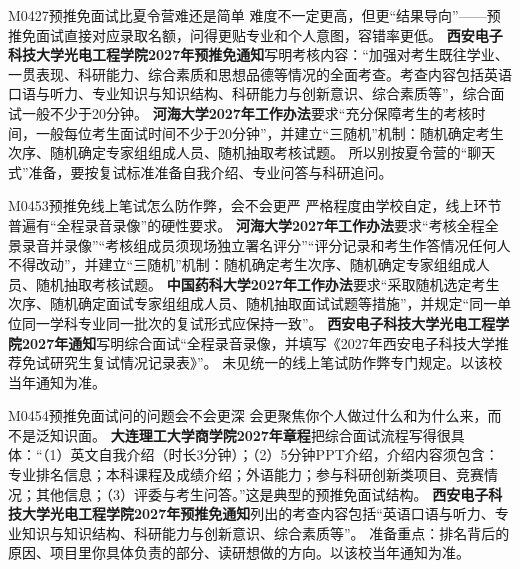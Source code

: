 \begin{qa}{M0427}{预推免面试比夏令营难还是简单}
难度不一定更高，但更“结果导向”——预推免面试直接对应录取名额，问得更贴专业和个人意图，容错率更低。
\textbf{西安电子科技大学光电工程学院2027年预推免通知}写明考核内容：“加强对考生既往学业、一贯表现、科研能力、综合素质和思想品德等情况的全面考查。考查内容包括英语口语与听力、专业知识与知识结构、科研能力与创新意识、综合素质等”，综合面试一般不少于20分钟。
\textbf{河海大学2027年工作办法}要求“充分保障考生的考核时间，一般每位考生面试时间不少于20分钟”，并建立“三随机”机制：随机确定考生次序、随机确定专家组组成人员、随机抽取考核试题。
所以别按夏令营的“聊天式”准备，要按复试标准准备自我介绍、专业问答与科研追问。
\end{qa}

\begin{qa}{M0453}{预推免线上笔试怎么防作弊，会不会更严}
严格程度由学校自定，线上环节普遍有“全程录音录像”的硬性要求。
\textbf{河海大学2027年工作办法}要求“考核全程全景录音并录像”“考核组成员须现场独立署名评分”“评分记录和考生作答情况任何人不得改动”，并建立“三随机”机制：随机确定考生次序、随机确定专家组组成人员、随机抽取考核试题。
\textbf{中国药科大学2027年工作办法}要求“采取随机选定考生次序、随机确定面试专家组组成人员、随机抽取面试试题等措施”，并规定“同一单位同一学科专业同一批次的复试形式应保持一致”。
\textbf{西安电子科技大学光电工程学院2027年通知}写明综合面试“全程录音录像，并填写《2027年西安电子科技大学推荐免试研究生复试情况记录表》”。
未见统一的线上笔试防作弊专门规定。以该校当年通知为准。
\end{qa}

\begin{qa}{M0454}{预推免面试问的问题会不会更深}
会更聚焦你个人做过什么和为什么来，而不是泛知识面。
\textbf{大连理工大学商学院2027年章程}把综合面试流程写得很具体：“（1）英文自我介绍（时长3分钟）；（2）5分钟PPT介绍，介绍内容须包含：专业排名信息；本科课程及成绩介绍；外语能力；参与科研创新类项目、竞赛情况；其他信息；（3）评委与考生问答。”这是典型的预推免面试结构。
\textbf{西安电子科技大学光电工程学院2027年预推免通知}列出的考查内容包括“英语口语与听力、专业知识与知识结构、科研能力与创新意识、综合素质等”。
准备重点：排名背后的原因、项目里你具体负责的部分、读研想做的方向。以该校当年通知为准。
\end{qa}

